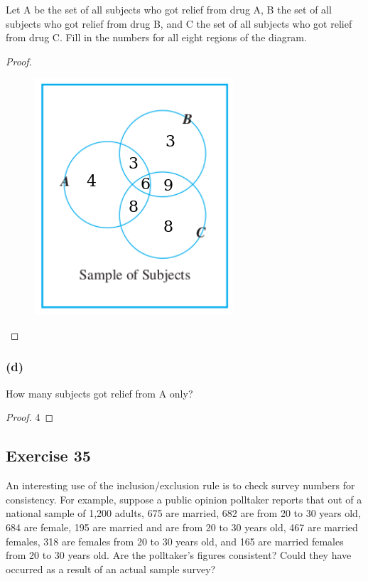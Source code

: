 \documentclass[14pt]{extarticle}
\begin{document}
Let A be the set of all subjects who got relief from drug A, B the set of all subjects who got relief from drug B,
and C the set of all subjects who got relief from drug C. Fill in the numbers for all eight regions of the diagram.

\begin{proof}
     \begin{figure}[ht!]
          \centering
          \includegraphics[scale=0.4]{../images/9.3.34.c.2.png}
     \end{figure}
\end{proof}

\subsubsection{(d)}
How many subjects got relief from A only?

\begin{proof}
     4
\end{proof}

\subsection{Exercise 35}
An interesting use of the inclusion/exclusion rule is to check survey numbers for consistency. For example, suppose
a public opinion polltaker reports that out of a national sample of 1,200 adults, 675 are married, 682 are from 20 to
30 years old, 684 are female, 195 are married and are from 20 to 30 years old, 467 are married females, 318 are
females from 20 to 30 years old, and 165 are married females from 20 to 30 years old. Are the polltaker’s
figures consistent? Could they have occurred as a result of an actual sample survey?
\end{document}
